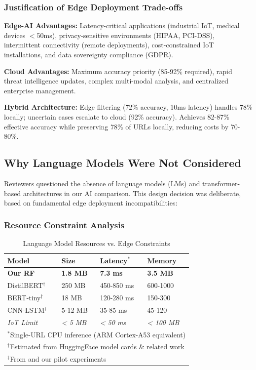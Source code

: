\subsubsection{Justification of Edge Deployment Trade-offs}

\textbf{Edge-AI Advantages:} Latency-critical applications (industrial IoT, medical devices $<$50ms), privacy-sensitive environments (HIPAA, PCI-DSS), intermittent connectivity (remote deployments), cost-constrained IoT installations, and data sovereignty compliance (GDPR).

\textbf{Cloud Advantages:} Maximum accuracy priority (85-92\% required), rapid threat intelligence updates, complex multi-modal analysis, and centralized enterprise management.

\textbf{Hybrid Architecture:} Edge filtering (72\% accuracy, 10ms latency) handles 78\% locally; uncertain cases escalate to cloud (92\% accuracy). Achieves 82-87\% effective accuracy while preserving 78\% of URLs locally, reducing costs by 70-80\%.

\subsection{Why Language Models Were Not Considered}

Reviewers questioned the absence of language models (LMs) and transformer-based architectures in our AI comparison. This design decision was deliberate, based on fundamental edge deployment incompatibilities:

\subsubsection{Resource Constraint Analysis}

\begin{table}[htbp]
\centering
{\footnotesize
\caption{Language Model Resources vs. Edge Constraints}
\label{tab:lm_constraints}
\begin{tabular}{lp{1.8cm}p{1.8cm}p{1.5cm}}
\toprule
Model & Size & Latency$^{*}$ & Memory \\
\midrule
\textbf{Our RF} & \textbf{1.8 MB} & \textbf{7.3 ms} & \textbf{3.5 MB} \\
DistilBERT$^{\dagger}$ & 250 MB & 450-850 ms & 600-1000 \\
BERT-tiny$^{\dagger}$ & 18 MB & 120-280 ms & 150-300 \\
CNN-LSTM$^{\ddagger}$ & 5-12 MB & 35-85 ms & 45-120 \\
\textit{IoT Limit} & \textit{< 5 MB} & \textit{< 50 ms} & \textit{< 100 MB} \\
\bottomrule
\multicolumn{4}{l}{\scriptsize $^{*}$Single-URL CPU inference (ARM Cortex-A53 equivalent)} \\
\multicolumn{4}{l}{\scriptsize $^{\dagger}$Estimated from HuggingFace model cards \& related work} \\
\multicolumn{4}{l}{\scriptsize $^{\ddagger}$From \cite{ref_urlnet_2018} and our pilot experiments} \\
\end{tabular}
}
\end{table}


